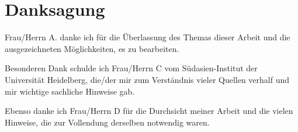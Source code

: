 \thispagestyle{empty}
\section{Danksagung}
\vspace*{1em}

Frau/Herrn A. danke ich für die Überlassung des Themas dieser Arbeit und 
die ausgezeichneten Möglichkeiten, es zu bearbeiten.\newline

Besonderen Dank schulde ich Frau/Herrn C vom Südasien-Institut der Universität Heidelberg, 
die/der mir zum Verständnis vieler Quellen verhalf und mir wichtige sachliche Hinweise gab.\newline

Ebenso danke ich Frau/Herrn D für die Durchsicht meiner Arbeit und die vielen Hinweise,
die zur Vollendung derselben notwendig waren.\newline

